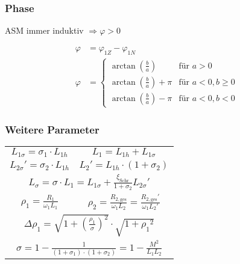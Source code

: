 \begin{sectionbox}
\subsubsection{Phase}
\begin{emphbox}
ASM immer induktiv $\Rightarrow \varphi > 0$
\end{emphbox}
\begin{align*}
\varphi &= \varphi_{1Z}-\varphi_{1N}\\
\varphi &= \begin{cases}
\arctan(\frac{b}{a}) & \text{für } a > 0\\
\arctan(\frac{b}{a})+\pi & \text{für } a < 0, b\geq 0\\
\arctan(\frac{b}{a})-\pi & \text{für } a < 0, b<0
\end{cases}
\end{align*}
\end{sectionbox}

\begin{sectionbox}
\subsubsection{Weitere Parameter}
\begin{tabularx}{\columnwidth}{CC}
$L_{1\sigma} = \sigma_1\cdot L_{1h}$ & $L_1 = L_{1h} + L_{1\sigma}$\\
$L_{2\sigma}' = \sigma_2\cdot L_{1h}$ & $L_2' = L_{1h}\cdot (1+\sigma_2)$\\
\\
$\rho_1 = \frac{R_1}{\omega_1 L_1}$ & $\rho_2 = \frac{R_{2,\text{ges}}}{\omega_1 L_2} = \frac{R_{2,\text{ges}}'}{\omega_1 L_2'}$\\
\\
\end{tabularx}
\end{sectionbox}

